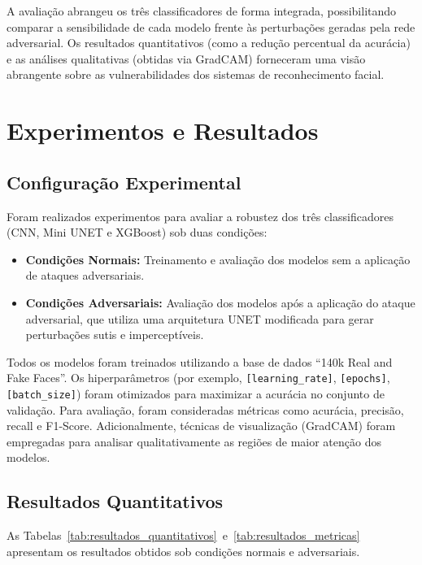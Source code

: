 \documentclass[12pt]{article}
\begin{document}
A avaliação abrangeu os três classificadores de forma integrada, possibilitando
comparar a sensibilidade de cada modelo frente às perturbações geradas pela
rede adversarial. Os resultados quantitativos (como a redução percentual da
acurácia) e as análises qualitativas (obtidas via GradCAM) forneceram uma visão
abrangente sobre as vulnerabilidades dos sistemas de reconhecimento facial.

\section{Experimentos e Resultados}

\subsection{Configuração Experimental}
Foram realizados experimentos para avaliar a robustez dos três classificadores
(CNN, Mini UNET e XGBoost) sob duas condições:
\begin{itemize}
  \item \textbf{Condições Normais:} Treinamento e avaliação dos modelos sem a aplicação de ataques adversariais.
  \item \textbf{Condições Adversariais:} Avaliação dos modelos após a aplicação do ataque adversarial, que utiliza uma arquitetura UNET modificada para gerar perturbações sutis e imperceptíveis.
\end{itemize}

Todos os modelos foram treinados utilizando a base de dados ``140k Real and
Fake Faces''. Os hiperparâmetros (por exemplo, \texttt{[learning\_rate]},
\texttt{[epochs]}, \texttt{[batch\_size]}) foram otimizados para maximizar a
acurácia no conjunto de validação. Para avaliação, foram consideradas métricas
como acurácia, precisão, recall e F1-Score. Adicionalmente, técnicas de
visualização (GradCAM) foram empregadas para analisar qualitativamente as
regiões de maior atenção dos modelos.

\subsection{Resultados Quantitativos}
As Tabelas~\ref{tab:resultados_quantitativos}~e~\ref{tab:resultados_metricas}
apresentam os resultados obtidos sob condições normais e adversariais.
\end{document}

